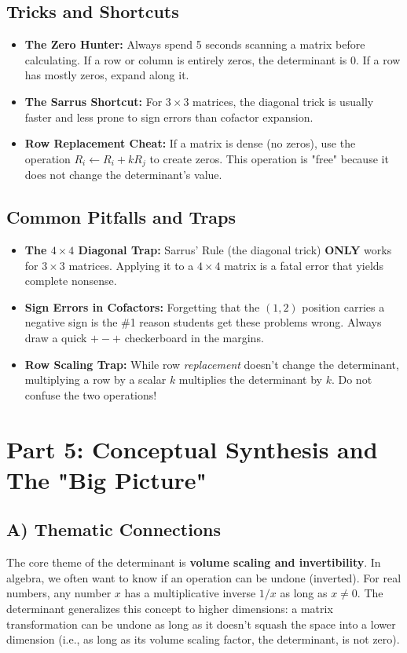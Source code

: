 \documentclass{article}
\begin{document}
\subsection{Tricks and Shortcuts}
\begin{itemize}
    \item \textbf{The Zero Hunter:} Always spend 5 seconds scanning a matrix before calculating. If a row or column is entirely zeros, the determinant is $0$. If a row has mostly zeros, expand along it.
    \item \textbf{The Sarrus Shortcut:} For $3 \times 3$ matrices, the diagonal trick is usually faster and less prone to sign errors than cofactor expansion.
    \item \textbf{Row Replacement Cheat:} If a matrix is dense (no zeros), use the operation $R_i \leftarrow R_i + kR_j$ to create zeros. This operation is "free" because it does not change the determinant's value.
\end{itemize}

\subsection{Common Pitfalls and Traps}
\begin{itemize}
    \item \textbf{The $4 \times 4$ Diagonal Trap:} Sarrus' Rule (the diagonal trick) \textbf{ONLY} works for $3 \times 3$ matrices. Applying it to a $4 \times 4$ matrix is a fatal error that yields complete nonsense.
    \item \textbf{Sign Errors in Cofactors:} Forgetting that the $(1,2)$ position carries a negative sign is the \#1 reason students get these problems wrong. Always draw a quick $+ - +$ checkerboard in the margins.
    \item \textbf{Row Scaling Trap:} While row \textit{replacement} doesn't change the determinant, multiplying a row by a scalar $k$ multiplies the determinant by $k$. Do not confuse the two operations!
\end{itemize}

\newpage
\section{Part 5: Conceptual Synthesis and The "Big Picture"}

\subsection{A) Thematic Connections}
The core theme of the determinant is \textbf{volume scaling and invertibility}. In algebra, we often want to know if an operation can be undone (inverted). For real numbers, any number $x$ has a multiplicative inverse $1/x$ as long as $x \neq 0$. The determinant generalizes this concept to higher dimensions: a matrix transformation can be undone as long as it doesn't squash the space into a lower dimension (i.e., as long as its volume scaling factor, the determinant, is not zero).
\end{document}
